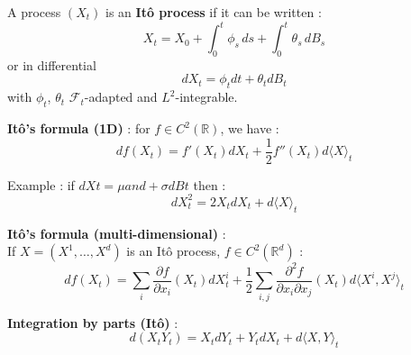 \begin{f}
	
A process $(X_t)$ is an \textbf{Itô process} if it can be written :
	\[
	X_t = X_0 + \int_0^t \phi_s\, ds + \int_0^t \theta_s\, dB_s
	\]
	or in differential
	\[dX_t = \phi_t dt + \theta_t dB_t\]
	with $\phi_t$, $\theta_t$ $\mathcal{F}_t$-adapted and $L^2$-integrable.
	
	\textbf{Itô's formula (1D)} : for $f \in C^2(\mathbb{R})$, we have :
	\[
	df(X_t) = f'(X_t) dX_t + \frac{1}{2} f''(X_t) d\langle X \rangle_t
	\]
	
	Example : if $dXt = \mu and + \sigma dBt$ then :
	\[
	dX_t^2 = 2X_t dX_t + d\langle X \rangle_t
	\]
	
	\textbf{Itô's formula (multi-dimensional)} :\\
	If $X = (X^1, \dots, X^d)$ is an Itô process, $f \in C^2(\mathbb{R}^d)$ :
	\[
	df(X_t) = \sum_i \frac{\partial f}{\partial x_i}(X_t) dX^i_t
	+ \frac{1}{2} \sum_{i,j} \frac{\partial^2 f}{\partial x_i \partial x_j}(X_t) d\langle X^i, X^j \rangle_t
	\]
	
	\textbf{Integration by parts (Itô)} :
	\[
	d(X_t Y_t) = X_t dY_t + Y_t dX_t + d\langle X, Y \rangle_t
	\]
	
\end{f}


